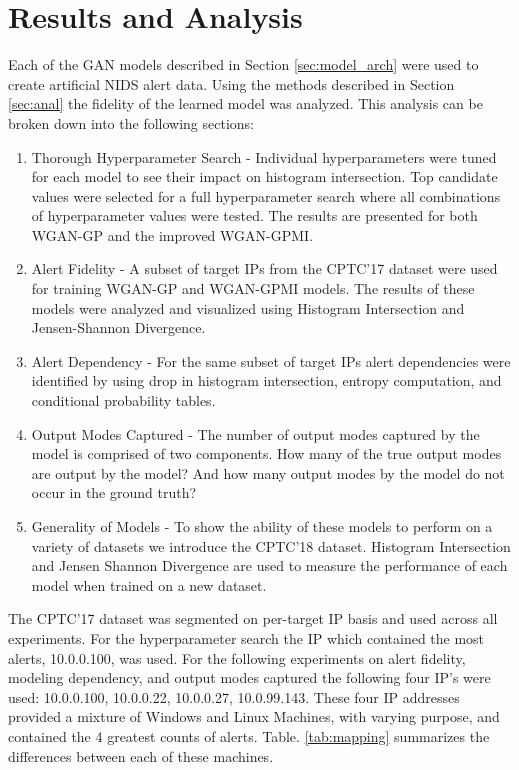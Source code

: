 \chapter{Results and Analysis}
\label{sec:rna}


Each of the GAN models described in Section \ref{sec:model_arch} were used to create artificial NIDS alert data.  Using the methods described in Section \ref{sec:anal} the fidelity of the learned model was analyzed. This analysis can be broken down into the following sections:

\begin{enumerate}
	\item Thorough Hyperparameter Search - Individual hyperparameters were tuned for each model to see their impact on histogram intersection. Top candidate values were selected for a full hyperparameter search where all combinations of hyperparameter values were tested. The results are presented for both WGAN-GP and the improved WGAN-GPMI.

	\item Alert Fidelity - A subset of target IPs from the CPTC'17 dataset were used for training WGAN-GP and WGAN-GPMI models. The results of these models were analyzed and visualized using Histogram Intersection and Jensen-Shannon Divergence.

	\item Alert Dependency - For the same subset of target IPs alert dependencies were identified by using drop in histogram intersection, entropy computation, and conditional probability tables.

	\item Output Modes Captured - The number of output modes captured by the model is comprised of two components. How many of the true output modes are output by the model? And how many output modes by the model do not occur in the ground truth?

	\item Generality of Models - To show the ability of these models to perform on a variety of datasets we introduce the CPTC'18 dataset. Histogram Intersection and Jensen Shannon Divergence are used to measure the performance of each model when trained on a new dataset.

\end{enumerate}

The CPTC'17 dataset was segmented on per-target IP basis and used across all experiments. For the hyperparameter search the IP which contained the most alerts, 10.0.0.100, was used. For the following experiments on alert fidelity, modeling dependency, and output modes captured the following four IP's were used: 10.0.0.100, 10.0.0.22, 10.0.0.27, 10.0.99.143. These four IP addresses provided a mixture of Windows and Linux Machines, with varying purpose, and contained the 4 greatest counts of alerts. Table. \ref{tab:mapping} summarizes the differences between each of these machines.

